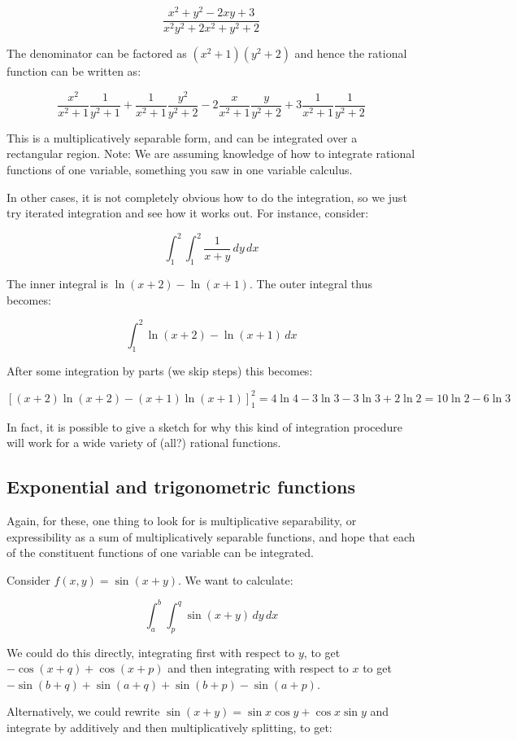 \documentclass[10pt]{amsart}
\begin{document}
$$\frac{x^2 + y^2 - 2xy + 3}{x^2y^2 + 2x^2 + y^2 + 2}$$

The denominator can be factored as $(x^2 + 1)(y^2 + 2)$ and hence the rational function can be written as:

$$\frac{x^2}{x^2 + 1}\frac{1}{y^2 + 1} + \frac{1}{x^2 + 1}\frac{y^2}{y^2 + 2} - 2 \frac{x}{x^2 + 1}\frac{y}{y^2 + 2} + 3\frac{1}{x^2 + 1}\frac{1}{y^2 + 2}$$

This is a multiplicatively separable form, and can be integrated over
a rectangular region. Note: We are assuming knowledge of how to
integrate rational functions of one variable, something you saw in one
variable calculus.

In other cases, it is not completely obvious how to do the
integration, so we just try iterated integration and see how it works
out. For instance, consider:

$$\int_1^2 \int_1^2 \frac{1}{x + y} \, dy \, dx$$

The inner integral is $\ln(x + 2) - \ln(x + 1)$. The outer integral thus becomes:

$$\int_1^2 \ln(x + 2) - \ln(x + 1) \, dx$$

After some integration by parts (we skip steps) this becomes:

$$[(x + 2)\ln(x + 2) - (x + 1)\ln(x + 1)]_1^2 = 4\ln 4 - 3 \ln 3 - 3 \ln 3 + 2 \ln 2 = 10 \ln 2 - 6 \ln 3$$

In fact, it is possible to give a sketch for why this kind of
integration procedure will work for a wide variety of (all?) rational
functions.

\subsection{Exponential and trigonometric functions}

Again, for these, one thing to look for is multiplicative
separability, or expressibility as a sum of multiplicatively separable
functions, and hope that each of the constituent functions of one
variable can be integrated.

Consider $f(x,y) = \sin(x + y)$. We want to calculate:

$$\int_a^b \int_p^q \sin(x + y) \, dy \, dx$$

We could do this directly, integrating first with respect to $y$, to
get $-\cos(x + q) + \cos(x + p)$ and then integrating with respect to
$x$ to get $-\sin(b + q) + \sin(a + q) + \sin(b + p) - \sin(a + p)$.

Alternatively, we could rewrite $\sin (x + y) = \sin x \cos y + \cos x
\sin y$ and integrate by additively and then multiplicatively
splitting, to get:
\end{document}
